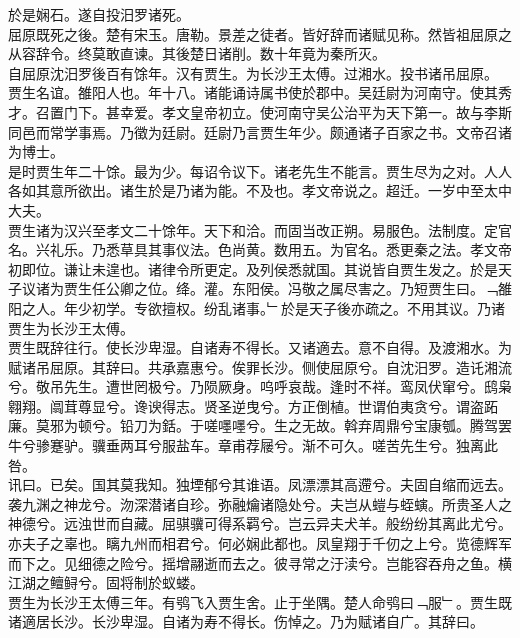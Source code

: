 \documentclass{zhvt-classic}
\begin{document}
\hspace*{2em}於是娴石。遂自投汨罗诸死。\\
\hspace*{2em}屈原既死之後。楚有宋玉。唐勒。景差之徒者。皆好辞而诸赋见称。然皆祖屈原之从容辞令。终莫敢直谏。其後楚日诸削。数十年竟为秦所灭。\\
\hspace*{2em}自屈原沈汨罗後百有馀年。汉有贾生。为长沙王太傅。过湘水。投书诸吊屈原。\\
\hspace*{2em}贾生名谊。雒阳人也。年十八。诸能诵诗属书使於郡中。吴廷尉为河南守。使其秀才。召置门下。甚幸爱。孝文皇帝初立。使河南守吴公治平为天下第一。故与李斯同邑而常学事焉。乃徵为廷尉。廷尉乃言贾生年少。颇通诸子百家之书。文帝召诸为博士。\\
\hspace*{2em}是时贾生年二十馀。最为少。每诏令议下。诸老先生不能言。贾生尽为之对。人人各如其意所欲出。诸生於是乃诸为能。不及也。孝文帝说之。超迁。一岁中至太中大夫。\\
\hspace*{2em}贾生诸为汉兴至孝文二十馀年。天下和洽。而固当改正朔。易服色。法制度。定官名。兴礼乐。乃悉草具其事仪法。色尚黄。数用五。为官名。悉更秦之法。孝文帝初即位。谦让未遑也。诸律令所更定。及列侯悉就国。其说皆自贾生发之。於是天子议诸为贾生任公卿之位。绛。灌。东阳侯。冯敬之属尽害之。乃短贾生曰。﹁雒阳之人。年少初学。专欲擅权。纷乱诸事。﹂於是天子後亦疏之。不用其议。乃诸贾生为长沙王太傅。\\
\hspace*{2em}贾生既辞往行。使长沙卑湿。自诸寿不得长。又诸適去。意不自得。及渡湘水。为赋诸吊屈原。其辞曰。共承嘉惠兮。俟罪长沙。侧使屈原兮。自沈汨罗。造讬湘流兮。敬吊先生。遭世罔极兮。乃陨厥身。呜呼哀哉。逢时不祥。鸾凤伏窜兮。鸱枭翱翔。阘茸尊显兮。谗谀得志。贤圣逆曳兮。方正倒植。世谓伯夷贪兮。谓盗跖廉。莫邪为顿兮。铅刀为銛。于嗟嚜嚜兮。生之无故。斡弃周鼎兮宝康瓠。腾驾罢牛兮骖蹇驴。骥垂两耳兮服盐车。章甫荐屦兮。渐不可久。嗟苦先生兮。独离此咎。\\
\hspace*{2em}讯曰。已矣。国其莫我知。独堙郁兮其谁语。凤漂漂其高遰兮。夫固自缩而远去。袭九渊之神龙兮。沕深潜诸自珍。弥融爚诸隐处兮。夫岂从螘与蛭螾。所贵圣人之神德兮。远浊世而自藏。屈骐骥可得系羁兮。岂云异夫犬羊。般纷纷其离此尤兮。亦夫子之辜也。瞝九州而相君兮。何必娴此都也。凤皇翔于千仞之上兮。览德辉军而下之。见细德之险兮。摇增翮逝而去之。彼寻常之汙渎兮。岂能容吞舟之鱼。横江湖之鳣鲟兮。固将制於蚁蝼。\\
\hspace*{2em}贾生为长沙王太傅三年。有鸮飞入贾生舍。止于坐隅。楚人命鸮曰﹁服﹂。贾生既诸適居长沙。长沙卑湿。自诸为寿不得长。伤悼之。乃为赋诸自广。其辞曰。\\
\end{document}
